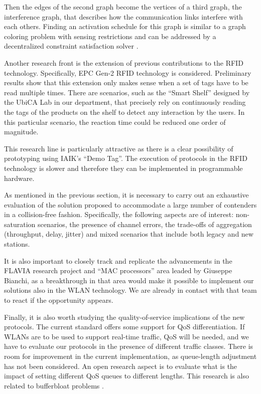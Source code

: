 \documentclass[a4paper,twocolumns]{article}%
\begin{document}
Then the edges of the second graph become the vertices of a third graph, the interference graph, that describes how the communication links interfere with each others.
Finding an activation schedule for this graph is similar to a graph coloring problem with sensing restrictions \cite{checco2012lbc} and can be addressed by a decentralized constraint satisfaction solver \cite{duffy2011dcs}.

Another research front is the extension of previous contributions to the RFID technology.
Specifically, EPC Gen-2 RFID technology is considered.
Preliminary results show that this extension only makes sense when a set of tags have to be read multiple times.
There are scenarios, such as the ``Smart Shelf'' designed by the UbiCA Lab in our department, that precisely rely on continuously reading the tags of the products on the shelf to detect any interaction by the users.
In this particular scenario, the reaction time could be reduced one order of magnitude.

This research line is particularly attractive as there is a clear possibility of prototyping using IAIK's ``Demo Tag''.
The execution of protocols in the RFID technology is slower and therefore they can be implemented in programmable hardware.

As mentioned in the previous section, it is necessary to carry out an exhaustive evaluation of the solution proposed to accommodate a large number of contenders in a collision-free fashion.
Specifically, the following aspects are of interest: non-saturation scenarios, the presence of channel errors, the trade-offs of aggregation (throughput, delay, jitter) and mixed scenarios that include both legacy and new stations.

It is also important to closely track and replicate the advancements in the FLAVIA research project and ``MAC processors'' area leaded by Giuseppe Bianchi, as a breakthrough in that area would make it possible to implement our solutions also in the WLAN technology.
We are already in contact with that team to react if the opportunity appears.

Finally, it is also worth studying the quality-of-service implications of the new protocols.
The current standard offers some support for QoS differentiation.
If WLANs are to be used to support real-time traffic, QoS will be needed, and we have to evaluate our protocols in the presence of different traffic classes.
There is room for improvement in the current implementation, as queue-length adjustment has not been considered.
An open research aspect is to evaluate what is the impact of setting different QoS queues to different lengths.
This research is also related to bufferbloat problems \cite{nichols2012cqd}.
\end{document}
